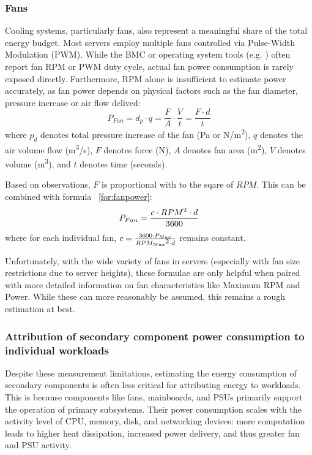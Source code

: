 \subsubsection{Fans}
Cooling systems, particularly fans, also represent a meaningful share of the total energy budget. Most servers employ multiple fans controlled via Pulse-Width Modulation (PWM). While the BMC or operating system tools (e.g. ) often report fan RPM or PWM duty cycle, actual fan power consumption is rarely exposed directly. Furthermore, RPM alone is insufficient to estimate power accurately, as fan power depends on physical factors such as the fan diameter, pressure increase or air flow delived\parencite{basmadjianCloudComputingIts2012}:
\begin{equation}
\label{for:fanpower}
    P_{Fan} = d_p \cdot q = \frac{F}{A} \cdot \frac{V}{t} = \frac{F \cdot d}{t}
\end{equation}
where $p_d$ denotes total pressure increase of the fan (Pa or N/m\textsuperscript{2}), $q$ denotes the air volume flow (m\textsuperscript{3}/s), $F$ denotes force (N), $A$ denotes fan area (m\textsuperscript{2}), $V$ denotes volume (m\textsuperscript{3}), and $t$ denotes time (seconds).

Based on observations, $F$ is proportional with to the sqare of $RPM$. This can be combined with formula ~\ref{for:fanpower}:
\begin{equation}
    P_{Fan} = \frac{c \cdot RPM\textsuperscript{2} \cdot d}{3600}
\end{equation}
where for each individual fan, $c = \frac{3600 \cdot P_{Max}}{RPM_{Max}\textsuperscript{2} \cdot d}$ remains constant.

Unfortunately, with the wide variety of fans in servers (especially with fan size restrictions due to server heights), these formulae are only helpful when paired with more detailed information on fan characteristics like Maximum RPM and Power. While these can more reasonably be assumed, this remains a rough estimation at best.

\subsubsection{Attribution of secondary component power consumption to individual workloads}
Despite these measurement limitations, estimating the energy consumption of secondary components is often less critical for attributing energy to workloads. This is because components like fans, mainboards, and PSUs primarily support the operation of primary subsystems. Their power consumption scales with the activity level of CPU, memory, disk, and networking devices: more computation leads to higher heat dissipation, increased power delivery, and thus greater fan and PSU activity.

